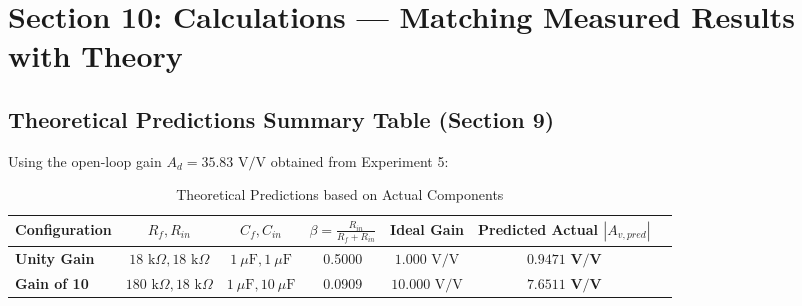 \documentclass[11pt,a4paper]{article}
\begin{document}
\newpage
\section{Section 10: Calculations --- Matching Measured Results with Theory}

\subsection{Theoretical Predictions Summary Table (Section 9)}
Using the open-loop gain $A_d = 35.83\text{ V/V}$ obtained from Experiment 5:
\begin{table}[H]
\centering
\caption{Theoretical Predictions based on Actual Components}
\label{tab:predictions}
\begin{tabular}{@{}lcccccc@{}}
\toprule
\textbf{Configuration} & \textbf{$R_f, R_{in}$} & \textbf{$C_f, C_{in}$} & \textbf{$\beta = \frac{R_{in}}{R_f+R_{in}}$} & \textbf{Ideal Gain} & \textbf{Predicted Actual $|A_{v,pred}|$} \\ \midrule
\textbf{Unity Gain}    & $18\text{ k}\Omega, 18\text{ k}\Omega$   & $1\ \mu\text{F}, 1\ \mu\text{F}$   & 0.5000 & $1.000\text{ V/V}$ & $\mathbf{0.9471\text{ V/V}}$ \\
\textbf{Gain of 10}    & $180\text{ k}\Omega, 18\text{ k}\Omega$  & $1\ \mu\text{F}, 10\ \mu\text{F}$  & 0.0909 & $10.000\text{ V/V}$ & $\mathbf{7.6511\text{ V/V}}$ \\ \bottomrule
\end{tabular}
\end{table}
\end{document}
